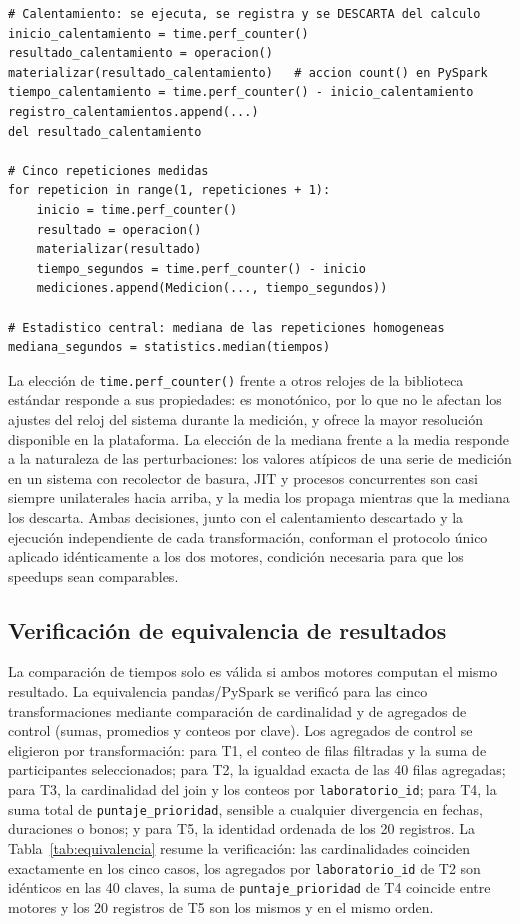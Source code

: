 \documentclass[10pt,journal]{IEEEtran}
\begin{document}
\begin{lstlisting}[caption={N\'ucleo del protocolo de medici\'on: calentamiento descartado, cinco repeticiones y mediana (extracto de \texttt{src/medicion.py}).},label={lst:medicion}]
# Calentamiento: se ejecuta, se registra y se DESCARTA del calculo
inicio_calentamiento = time.perf_counter()
resultado_calentamiento = operacion()
materializar(resultado_calentamiento)   # accion count() en PySpark
tiempo_calentamiento = time.perf_counter() - inicio_calentamiento
registro_calentamientos.append(...)
del resultado_calentamiento

# Cinco repeticiones medidas
for repeticion in range(1, repeticiones + 1):
    inicio = time.perf_counter()
    resultado = operacion()
    materializar(resultado)
    tiempo_segundos = time.perf_counter() - inicio
    mediciones.append(Medicion(..., tiempo_segundos))

# Estadistico central: mediana de las repeticiones homogeneas
mediana_segundos = statistics.median(tiempos)
\end{lstlisting}

La elecci\'on de \texttt{time.perf\_counter()} frente a otros relojes de la
biblioteca est\'andar responde a sus propiedades: es monot\'onico, por lo que
no le afectan los ajustes del reloj del sistema durante la medici\'on, y ofrece
la mayor resoluci\'on disponible en la plataforma. La elecci\'on de la mediana
frente a la media responde a la naturaleza de las perturbaciones: los valores
at\'ipicos de una serie de medici\'on en un sistema con recolector de basura,
JIT y procesos concurrentes son casi siempre unilaterales hacia arriba, y la
media los propaga mientras que la mediana los descarta. Ambas decisiones,
junto con el calentamiento descartado y la ejecuci\'on independiente de cada
transformaci\'on, conforman el protocolo \'unico aplicado id\'enticamente a los
dos motores, condici\'on necesaria para que los speedups sean comparables.

\subsection{Verificaci\'on de equivalencia de resultados}
\label{sec:equivalencia}
La comparaci\'on de tiempos solo es v\'alida si ambos motores computan el mismo
resultado. La equivalencia pandas/PySpark se verific\'o para las cinco
transformaciones mediante comparaci\'on de cardinalidad y de agregados de
control (sumas, promedios y conteos por clave). Los agregados de control se
eligieron por transformaci\'on: para T1, el conteo de filas filtradas y la suma
de participantes seleccionados; para T2, la igualdad exacta de las 40 filas
agregadas; para T3, la cardinalidad del join y los conteos por
\texttt{laboratorio\_id}; para T4, la suma total de
\texttt{puntaje\_prioridad}, sensible a cualquier divergencia en fechas,
duraciones o bonos; y para T5, la identidad ordenada de los 20 registros. La Tabla~\ref{tab:equivalencia}
resume la verificaci\'on: las cardinalidades coinciden exactamente en los cinco
casos, los agregados por \texttt{laboratorio\_id} de T2 son id\'enticos en las
40 claves, la suma de \texttt{puntaje\_prioridad} de T4 coincide entre motores
y los 20 registros de T5 son los mismos y en el mismo orden.
\end{document}
